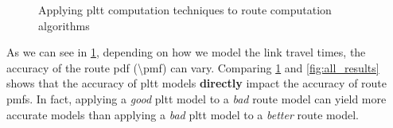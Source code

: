 \begin{figure}
    \centering
    \caption{Applying pltt computation techniques to route computation algorithms}
    \label{fig:route_pltt}
\end{figure}

As we can see in \cref{fig:route_pltt}, depending on how we model the link travel times, the accuracy of the route pdf (\textbackslash pmf) can vary. Comparing \cref{fig:route_pltt} and \cref{fig:all_results} shows that the accuracy of pltt models \textbf{directly} impact the accuracy of route pmfs. In fact, applying a \textit{good} pltt model to a \textit{bad} route model can yield more accurate models than applying a \textit{bad} pltt model to a \textit{better} route model.

